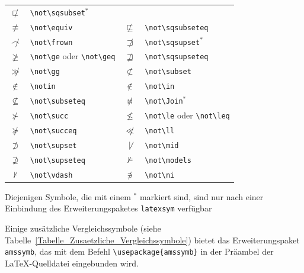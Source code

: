 \documentclass[a4paper,10pt,twoside]{scrbook}
\begin{document}
{\begin{table}[h!tb]
\begin{tabular}{clcl}
$\not\sqsubset$ & \texttt{\textbackslash not\textbackslash sqsubset$^\ast$} \\
$\not\equiv$ & \texttt{\textbackslash not\textbackslash equiv} &
$\not\sqsubseteq$ & \texttt{\textbackslash not\textbackslash sqsubseteq} \\
$\not\frown$ & \texttt{\textbackslash not\textbackslash frown} & 
$\not\sqsupset$ & \texttt{\textbackslash not\textbackslash sqsupset$^\ast$} \\
$\not\geq$ & \texttt{\textbackslash not\textbackslash ge} oder \texttt{\textbackslash not\textbackslash geq} & 
$\not\sqsupseteq$ & \texttt{\textbackslash not\textbackslash sqsupseteq} \\
$\not\gg$ & \texttt{\textbackslash not\textbackslash gg} & 
$\not\subset$ & \texttt{\textbackslash not\textbackslash subset} \\
$\notin$ & \texttt{\textbackslash notin} &
$\not\in$ & \texttt{\textbackslash not\textbackslash in} \\
$\not\subseteq$ & \texttt{\textbackslash not\textbackslash subseteq} &
$\not\Join$ & \texttt{\textbackslash not\textbackslash Join$^\ast$} \\
$\not\succ$ & \texttt{\textbackslash not\textbackslash succ} &
$\not\le$ & \texttt{\textbackslash not\textbackslash le} oder \texttt{\textbackslash not\textbackslash leq} \\
$\not\succeq$ & \texttt{\textbackslash not\textbackslash succeq} &
$\not\ll$ & \texttt{\textbackslash not\textbackslash ll} \\
$\not\supset$ & \texttt{\textbackslash not\textbackslash supset} &
$\not\mid$ & \texttt{\textbackslash not\textbackslash mid} \\
$\not\supseteq$ & \texttt{\textbackslash not\textbackslash supseteq} &
$\not\models$ & \texttt{\textbackslash not\textbackslash models} \\
$\not\vdash$ & \texttt{\textbackslash not\textbackslash vdash} &
$\not\ni$ & \texttt{\textbackslash not\textbackslash ni} \\
\hline
\end{tabular}
\end{table}

Diejenigen Symbole, die mit einem $^\ast$ markiert sind, sind nur nach einer
Einbindung des Erweiterungspaketes \texttt{latexsym} verfügbar

Einige zusätzliche Vergleichssymbole (siehe Tabelle~\ref{Tabelle_Zusaetzliche_Vergleichssymbole}) 
bietet das Erweiterungspaket \verb!amssymb!, 
das mit dem Befehl \verb!\usepackage{amssymb}! in der Präambel der \LaTeX-Quelldatei eingebunden wird.

}
\end{document}
